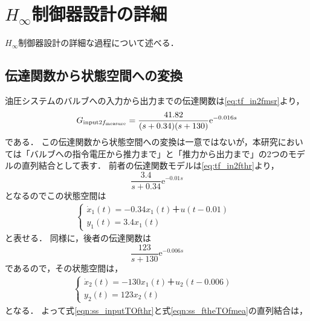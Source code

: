\chapter{$H_\infty$制御器設計の詳細}
$H_\infty$制御器設計の詳細な過程について述べる．
\section{伝達関数から状態空間への変換}
\label{sec:tf2ss}
油圧システムのバルブへの入力から出力までの伝達関数は\eqnname\eqref{eq:tf_in2fmsr}より，
\begin{align}
    G_{\mathrm{input}2f_\mathrm{measure}} = \frac{41.82}{(s+0.34)(s+130)}\mathrm{e}^{-0.016s}
\end{align}
である．
この伝達関数から状態空間への変換は一意ではないが，本研究においては「バルブへの指令電圧から推力まで」と「推力から出力まで」の2つのモデルの直列結合として表す．
前者の伝達関数モデルは\eqnname\eqref{eq:tf_in2fthr}より，
\begin{equation}
	\frac{3.4}{s+0.34}\mathrm{e}^{-0.01s}
\end{equation}
となるのでこの状態空間は
\begin{align}
	\begin{cases}
		\dot{x}_1(t) = -0.34x_1(t)＋u(t-0.01) &\\
		y_1(t) = 3.4x_1(t)&
	\end{cases}
	\label{eqn:ss_inputTOfthr}
\end{align}
と表せる．
同様に，後者の伝達関数は
\begin{equation}
	\frac{123}{s+130}\mathrm{e}^{-0.006s}
\end{equation}
であるので，その状態空間は，
\begin{align}
	\begin{cases}
		\dot{x}_2(t) = -130x_1(t)＋u_2(t-0.006) &\\
		y_2(t) = 123x_2(t)&
	\end{cases}
	\label{eqn:ss_ftheTOfmea}
\end{align}
となる．
よって式\eqref{eqn:ss_inputTOfthr}と式\eqref{eqn:ss_ftheTOfmea}の直列結合は，
